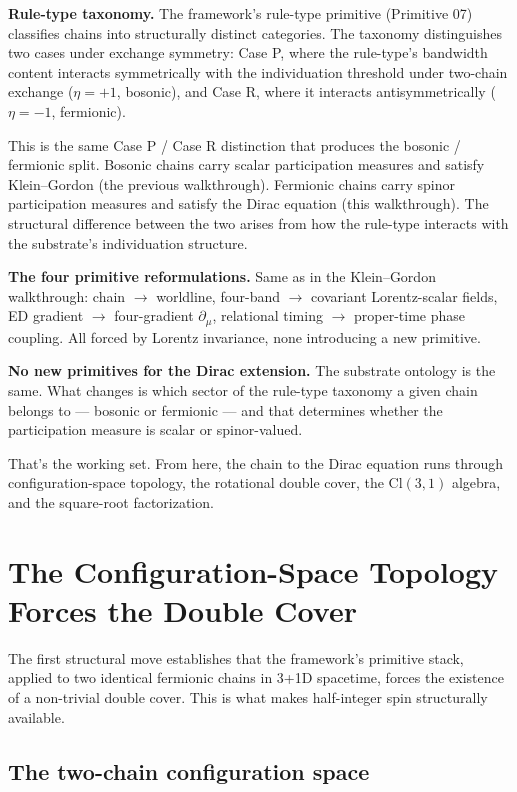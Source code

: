 \documentclass[11pt,a4paper]{article}
\begin{document}
\textbf{Rule-type taxonomy.} The framework's rule-type primitive (Primitive 07) classifies chains into structurally distinct categories. The taxonomy distinguishes two cases under exchange symmetry: Case P, where the rule-type's bandwidth content interacts symmetrically with the individuation threshold under two-chain exchange ($\eta = +1$, bosonic), and Case R, where it interacts antisymmetrically ($\eta = -1$, fermionic).

This is the same Case P / Case R distinction that produces the bosonic / fermionic split. Bosonic chains carry scalar participation measures and satisfy Klein--Gordon (the previous walkthrough). Fermionic chains carry spinor participation measures and satisfy the Dirac equation (this walkthrough). The structural difference between the two arises from how the rule-type interacts with the substrate's individuation structure.

\textbf{The four primitive reformulations.} Same as in the Klein--Gordon walkthrough: chain $\to$ worldline, four-band $\to$ covariant Lorentz-scalar fields, ED gradient $\to$ four-gradient $\partial_\mu$, relational timing $\to$ proper-time phase coupling. All forced by Lorentz invariance, none introducing a new primitive.

\textbf{No new primitives for the Dirac extension.} The substrate ontology is the same. What changes is which sector of the rule-type taxonomy a given chain belongs to --- bosonic or fermionic --- and that determines whether the participation measure is scalar or spinor-valued.

That's the working set. From here, the chain to the Dirac equation runs through configuration-space topology, the rotational double cover, the $\mathrm{Cl}(3,1)$ algebra, and the square-root factorization.

\section{The Configuration-Space Topology Forces the Double Cover}

The first structural move establishes that the framework's primitive stack, applied to two identical fermionic chains in 3+1D spacetime, forces the existence of a non-trivial double cover. This is what makes half-integer spin structurally available.

\subsection{The two-chain configuration space}
\end{document}
